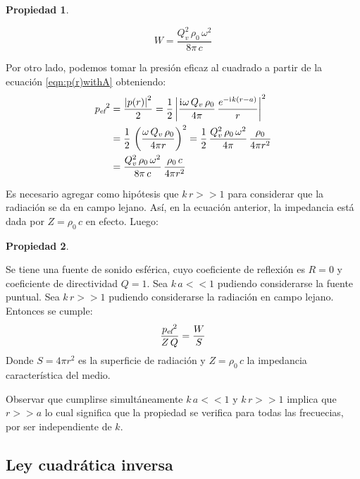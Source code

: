 \documentclass[a5paper,12pt,twoside]{book}
\newtheorem{prop}{{Propiedad}}[chapter]
\begin{document}
\begin{mdframed}[style=MyFrame1]
    \begin{prop}
    \end{prop}
    \begin{equation*}
        W = \frac{Q_v^2 \, \rho_0 \, \omega^2}{8\pi \,c}
    \end{equation*}
\end{mdframed}

Por otro lado, podemos tomar la presión eficaz al cuadrado a partir de la ecuación \ref{eqn:p(r)withA} obteniendo:
\begin{align*}
    {{{p}_\textsl{{ef}}}}^2 &= \frac{{\left| {p(r)} \right|}^2}{2}
    = \frac{1}{2} \, {\left| {\frac{\mathrm{i}\mkern1mu \omega \, Q_v \, \rho_0 }{4\pi} \, \frac{e^{-\mathrm{i}\mkern1mu k (r-a)}}{r}} \right|}^2
    \\
    &= \frac{1}{2} \, \left(\frac{\omega \, Q_v \, \rho_0 }{4\pi r}\right)^2
    = \frac{1}{2} \, \frac{Q_v^2 \, \rho_0 \, \omega^2}{4\pi} \, \frac{\rho_0}{4\pi r^2}
    \\
    &= \frac{Q_v^2 \, \rho_0 \, \omega^2}{8\pi \, c} \, \frac{\rho_0 \, c}{4\pi r^2}
\end{align*}

Es necesario agregar como hipótesis que $k\,r>>1$ para considerar que la radiación se da en campo lejano.
Así, en la ecuación anterior, la impedancia está dada por $Z=\rho_0 \, c$ en efecto.
Luego:

\begin{mdframed}[style=MyFrame1]
    \begin{prop}
        \label{prop:p^2/Z=W/S}
    \end{prop}
    Se tiene una fuente de sonido esférica, cuyo coeficiente de reflexión es $R=0$ y coeficiente de directividad $Q=1$.
    Sea $k\, a<<1$ pudiendo considerarse la fuente puntual.
    Sea $k\,r>>1$ pudiendo considerarse la radiación en campo lejano.
    Entonces se cumple:
    \begin{equation*}
        \frac{{{{p}_\textsl{{ef}}}}^2}{Z\,Q} = \frac{W}{S}
    \end{equation*}
    Donde $S=4\pi r^2$ es la superficie de radiación y $Z=\rho_0 \, c$ la impedancia característica del medio.
\end{mdframed}

Observar que cumplirse simultáneamente $k\, a<<1$ y $k\,r>>1$ implica que $r>>a$ lo cual significa que la propiedad se verifica para todas las frecuecias, por ser independiente de $k$.


\subsection{Ley cuadrática inversa}
\label{sec:inverseSquareLaw}
\end{document}
